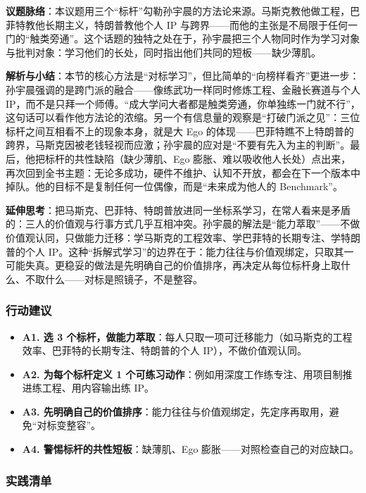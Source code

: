\textbf{议题脉络}：本议题用三个``标杆''勾勒孙宇晨的方法论来源。马斯克教他做工程，巴菲特教他长期主义，特朗普教他个人
IP
与跨界------而他的主张是不局限于任何一门的``触类旁通''。这个话题的独特之处在于，孙宇晨把三个人物同时作为学习对象与批判对象：学习他们的长处，同时指出他们共同的短板------缺少薄肌。

\textbf{解析与小结}：本节的核心方法是``对标学习''，但比简单的``向榜样看齐''更进一步：孙宇晨强调的是跨门派的融合------像练武功一样同时修炼工程、金融长赛道与个人
IP，而不是只拜一个师傅。``成大学问大者都是触类旁通，你单独练一门就不行''，这句话可以看作他方法论的浓缩。另一个有信息量的观察是``打破门派之见''：三位标杆之间互相看不上的现象本身，就是大
Ego
的体现------巴菲特瞧不上特朗普的跨界，马斯克因被老钱轻视而应激；孙宇晨的应对是``不要有先入为主的判断''。最后，他把标杆的共性缺陷（缺少薄肌、Ego
膨胀、难以吸收他人长处）点出来，再次回到全书主题：无论多成功，硬件不维护、认知不开放，都会在下一个版本中掉队。他的目标不是复制任何一位偶像，而是``未来成为他人的
Benchmark''。

\textbf{延伸思考}：把马斯克、巴菲特、特朗普放进同一坐标系学习，在常人看来是矛盾的：三人的价值观与行事方式几乎互相冲突。孙宇晨的解法是``能力萃取''------不做价值观认同，只做能力迁移：学马斯克的工程效率、学巴菲特的长期专注、学特朗普的个人
IP。这种``拆解式学习''的边界在于：能力往往与价值观绑定，只取其一可能失真。更稳妥的做法是先明确自己的价值排序，再决定从每位标杆身上取什么、不取什么------对标是照镜子，不是整容。

\subsubsection{行动建议}

\begin{itemize}
\tightlist
\item
  \textbf{A1. 选 3
  个标杆，做能力萃取}：每人只取一项可迁移能力（如马斯克的工程效率、巴菲特的长期专注、特朗普的个人
  IP），不做价值观认同。
\item
  \textbf{A2. 为每个标杆定义 1
  个可练习动作}：例如用深度工作练专注、用项目制推进练工程、用内容输出练
  IP。
\item
  \textbf{A3.
  先明确自己的价值排序}：能力往往与价值观绑定，先定序再取用，避免``对标变整容''。
\item
  \textbf{A4. 警惕标杆的共性短板}：缺薄肌、Ego
  膨胀------对照检查自己的对应缺口。
\end{itemize}

\subsubsection{实践清单}

